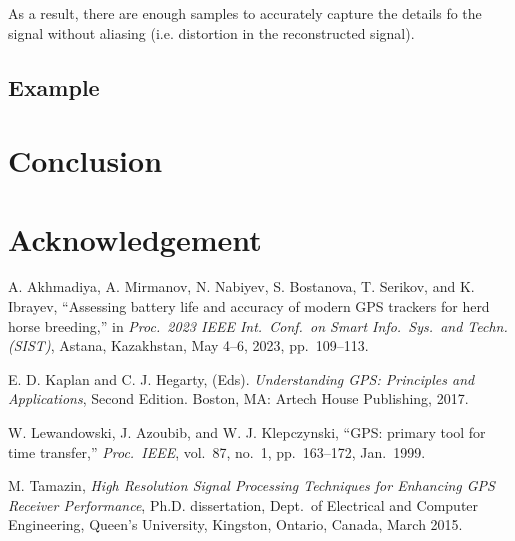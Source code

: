 \documentclass[12pt]{article}
\begin{document}
As a result, there are enough samples to accurately capture the details fo the signal without aliasing (i.e. distortion 
in the reconstructed signal). 


\subsection{Example}

\section{Conclusion}

\section*{Acknowledgement}


\begin{thebibliography}{9}  %

A. Akhmadiya, A. Mirmanov, N. Nabiyev, S. Bostanova, T. Serikov,
and K. Ibrayev, ``Assessing battery life and accuracy of
modern GPS trackers for herd horse breeding,'' in \emph{Proc.~2023
IEEE Int.\ Conf.\ on Smart Info.\ Sys.\ and Techn. (SIST)},
Astana, Kazakhstan, May 4--6, 2023, pp.~109--113.

E. D. Kaplan and C. J. Hegarty, (Eds). \emph{Understanding GPS:  Principles
and Applications}, Second Edition.  Boston, MA: Artech House Publishing, 2017.

W. Lewandowski, J. Azoubib, and W. J. Klepczynski, ``GPS: primary
tool for time transfer,'' \emph{Proc.\ IEEE}, vol.~87, no.~1,
pp.~163--172, Jan.~1999.

M. Tamazin, \emph{High Resolution Signal Processing Techniques for
Enhancing GPS Receiver Performance}, Ph.D. dissertation,
Dept.~of Electrical and Computer Engineering, Queen's University,
Kingston, Ontario, Canada, March 2015.


\end{thebibliography}
\end{document}
